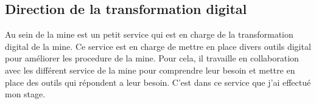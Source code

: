\subsection{Direction de la transformation digital}
Au sein de la mine est un petit service qui est en charge de la transformation digital de la mine. Ce service est en charge de mettre en place divers outils digital pour améliorer les procedure de la mine. Pour cela, il travaille en collaboration avec les différent service de la mine pour comprendre leur besoin et mettre en place des outils qui répondent a leur besoin. C'est dans ce service que j'ai effectué mon stage.